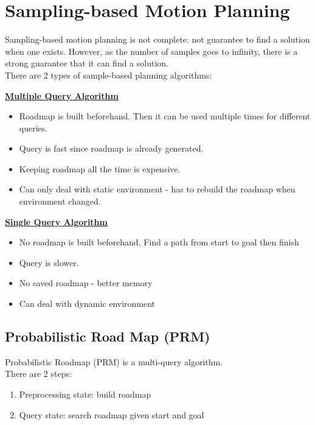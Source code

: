 \documentclass[11pt]{article}
\begin{document}
\section{Sampling-based Motion Planning}
Sampling-based motion planning is not complete: not guarantee to find a solution when one exists. However, as the number of samples goes to infinity, there is a strong guarantee that it can find a solution.\\
There are 2 types of sample-based planning algorithms:\\
\begin{multicols*}{2}
\textbf{\underline{Multiple Query Algorithm}}
\begin{itemize}
\item Roadmap is built beforehand. Then it can be used multiple times for different queries.
\item Query is fast since roadmap is already generated.
\item Keeping roadmap all the time is expensive.
\item Can only deal with static environment - has to rebuild the roadmap when environment changed.
\end{itemize}
\vfill\null
\columnbreak
\textbf{\underline{Single Query Algorithm}}
\begin{itemize}
\item No roadmap is built beforehand. Find a path from start to goal then finish
\item Query is slower.\\
\item No saved roadmap - better memory \\
\item Can deal with dynamic environment 
\end{itemize}
\end{multicols*}

\subsection{Probabilistic Road Map (PRM)}
Probabilistic Roadmap (PRM) is a multi-query algorithm.\\
There are 2 steps:
\begin{enumerate}
\item Preprocessing state: build roadmap
\item Query state: search roadmap given start and goal
\end{enumerate}
\end{document}
